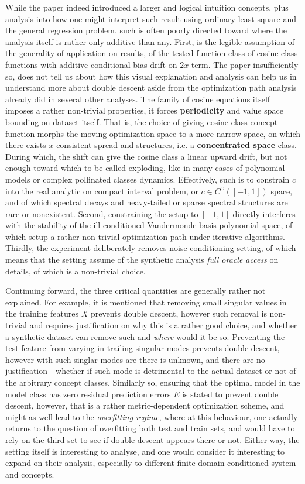 While the paper indeed introduced a larger and logical intuition concepts, plus analysis into how one might interpret such result using ordinary least square and the general regression problem, such is often poorly directed toward where the analysis itself is rather only additive than any. First, is the legible assumption of the generality of application on results, of the tested function class of cosine class functions with additive conditional bias drift on $2x$ term. The paper insufficiently so, does not tell us about how this visual explanation and analysis can help us in understand more about double descent aside from the optimization path analysis already did in several other analyses. The family of cosine equations itself imposes a rather non-trivial properties, it forces \textbf{periodicity} and value space bounding on dataset itself. That is, the choice of giving cosine class concept function morphs the moving optimization space to a more narrow space, on which there exists $x$-consistent spread and structures, i.e. a \textbf{concentrated space} class. During which, the shift can give the cosine class a linear upward drift, but not enough toward which to be called exploding, like in many cases of polynomial models or complex pollinated classes dynamics. Effectively, such is to constrain $c$ into the real analytic on compact interval problem, or $c\in C^{\omega}([-1,1])$ space, and of which spectral decays and heavy-tailed or sparse spectral structures are rare or nonexistent. 
Second, constraining the setup to $[-1,1]$ directly interferes with the stability of the ill-conditioned Vandermonde basis polynomial space, of which setup a rather non-trivial optimization path under iterative algorithms. Thirdly, the experiment deliberately removes noise-conditioning setting, of which means that the setting assume of the synthetic analysis \textit{full oracle access} on details, of which is a non-trivial choice. 

Continuing forward, the three critical quantities are generally rather not explained. For example, it is mentioned that removing small singular values in the training features $X$ prevents double descent, however such removal is non-trivial and requires justification on why this is a rather good choice, and whether a synthetic dataset can remove such and \textit{where} would it be so. Preventing the test feature from varying in trailing singular modes prevents double descent, however with such singlar modes are there is unknown, and there are no justification - whether if such mode is detrimental to the actual dataset or not of the arbitrary concept classes. Similarly so, ensuring that the optimal model in the model class has zero residual prediction errors $E$ is stated to prevent double descent, however, that is a rather metric-dependent optimization scheme, and might as well lead to the \textit{overfitting regime}, where at this behaviour, one actually returns to the question of overfitting both test and train sets, and would have to rely on the third set to see if double descent appears there or not. Either way, the setting itself is interesting to analyse, and one would consider it interesting to expand on their analysis, especially to different finite-domain conditioned system and concepts. 

